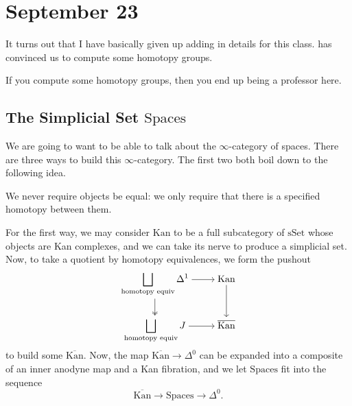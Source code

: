 \documentclass[../notes.tex]{subfiles}
\begin{document}
\section{September 23}
It turns out that I have basically given up adding in details for this class.  has convinced us to compute some homotopy groups.
\begin{remark}
	If you compute some homotopy groups, then you end up being a professor here.
\end{remark}

\subsection{The Simplicial Set \texorpdfstring{$\mathrm{Spaces}$}{ Spaces}}
We are going to want to be able to talk about the $\infty$-category of spaces. There are three ways to build this $\infty$-category. The first two both boil down to the following idea.
\begin{idea}
	We never require objects be equal: we only require that there is a specified homotopy between them.
\end{idea}
For the first way, we may consider $\mathrm{Kan}$ to be a full subcategory of $\mathrm{sSet}$ whose objects are Kan complexes, and we can take its nerve to produce a simplicial set. Now, to take a quotient by homotopy equivalences, we form the pushout
\[\begin{tikzcd}[cramped]
	{\displaystyle\bigsqcup_{\text{homotopy equiv}}\Delta^1} & {\mathrm{Kan}} \\
	{\displaystyle\bigsqcup_{\text{homotopy equiv}}J} & {\overline{\mathrm{Kan}}}
	\arrow[from=1-1, to=1-2]
	\arrow[two heads, from=1-1, to=2-1]
	\arrow[from=1-2, to=2-2]
	\arrow[from=2-1, to=2-2]
\end{tikzcd}\]
to build some $\overline{\mathrm{Kan}}$. Now, the map $\overline{\mathrm{Kan}}\to\Delta^0$ can be expanded into a composite of an inner anodyne map and a Kan fibration, and we let $\mathrm{Spaces}$ fit into the sequence
\[\overline{\mathrm{Kan}}\to\mathrm{Spaces}\to\Delta^0.\]
\end{document}
